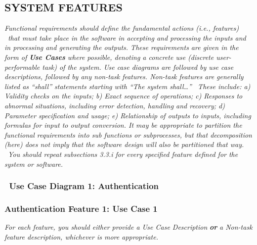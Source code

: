 \documentclass[twoside,letterpaper]{article}
\begin{document}
\subsection[SYSTEM FEATURES]{\rmfamily\bfseries\color{black} SYSTEM FEATURES}
\hypertarget{RefHeading21659017292}{}{\itshape\color{black}
Functional requirements should define the fundamental actions (i.e., features) \ that must take place in the software in
accepting and processing the inputs and in processing and generating the outputs. These requirements are given in the
form of \textbf{Use Cases} where possible, denoting a concrete use (discrete user-performable task) of the system. Use
case diagrams are followed by use case descriptions, followed by any non-task features. Non-task features are generally
listed as ``shall'' statements starting with ``The system shall{\dots}'' \ These include: a) Validity checks on the
inputs; b) Exact sequence of operations; c) Responses to abnormal situations, including error detection, handling and
recovery; d) Parameter specification and usage; e) Relationship of outputs to inputs, including formulas for input to
output conversion. \newline
\newline
It may be appropriate to partition the functional requirements into sub functions or subprocesses, but that
decomposition (here) does not imply that the software design will also be partitioned that way. \ You should repeat
subsections 3.3.i for every specified feature defined for the system or software.}

\subsubsection[Use Case Diagram 1: Authentication]{\foreignlanguage{english}{\ Use Case Diagram 1: Authentication}}
\hypertarget{RefHeading21859017292}{}{\color{black}
}


\newpage

\subsubsection[Authentication Feature 1: Use Case 1]{\rmfamily\bfseries\color{black}
Authentication Feature 1: Use Case 1}
\hypertarget{RefHeading22059017292}{}
\bigskip

{\color{black}
\foreignlanguage{english}{\textit{For each feature, you should either provide a Use Case Description
}}\foreignlanguage{english}{\textbf{\textit{or}}}\foreignlanguage{english}{\textit{ a Non-task feature description,
whichever is more appropriate.}}}
\end{document}
